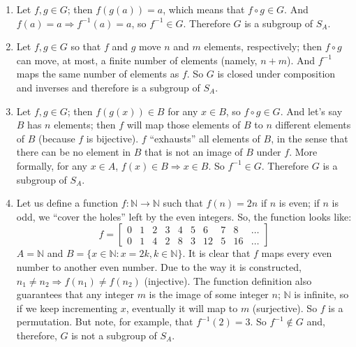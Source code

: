 \documentclass{article}
\begin{document}
\begin{enumerate}
    \item Let $f, g \in G$; then $f(g(a)) = a$, which means that $f \circ g \in G$. And $f(a) = a \Rightarrow f^{-1}(a) = a$, so $f^{-1} \in G$. Therefore $G$ is a subgroup of $S_A$.

    \item Let $f, g \in G$ so that $f$ and $g$ move $n$ and $m$ elements, respectively; then $f \circ g$ can move, at most, a finite number of elements (namely, $n + m$). And $f^{-1}$ maps the same number of elements as $f$. So $G$ is closed under composition and inverses and therefore is a subgroup of $S_A$.

    \item Let $f, g \in G$; then $f(g(x)) \in B$ for any $x \in B$, so $f \circ g \in G$. And let's say $B$ has $n$ elements; then $f$ will map those elements of $B$ to $n$ different elements of $B$ (because $f$ is bijective). $f$ ``exhausts'' all elements of $B$, in the sense that there can be no element in $B$ that is not an image of $B$ under $f$. More formally, for any $x \in A$, $f(x) \in B \Rightarrow x \in B$. So $f^{-1} \in G$. Therefore $G$ is a subgroup of $S_A$.

    \item Let us define a function $f: \mathbb{N} \to \mathbb{N}$ such that $f(n) = 2n$ if $n$ is even; if $n$ is odd, we ``cover the holes'' left by the even integers. So, the function looks like:
        $$
            f = \begin{bmatrix}
                0 & 1 & 2 & 3 & 4 & 5 & 6 & 7 & 8 & \ldots\\
                0 & 1 & 4 & 2 & 8 & 3 & 12 & 5 & 16 & \ldots
            \end{bmatrix}
        $$
    $A = \mathbb{N}$ and $B = \{x \in \mathbb{N}: x = 2k, k \in \mathbb{N}\}$. It is clear that $f$ maps every even number to another even number. Due to the way it is constructed, $n_1 \ne n_2 \Rightarrow f(n_1) \ne f(n_2)$ (injective). The function definition also guarantees that any integer $m$ is the image of some integer $n$; $\mathbb{N}$ is infinite, so if we keep incrementing $x$, eventually it will map to $m$ (surjective). So $f$ is a permutation. But note, for example, that $f^{-1}(2) = 3$. So $f^{-1} \notin G$ and, therefore, $G$ is not a subgroup of $S_A$.
\end{enumerate}
\end{document}
